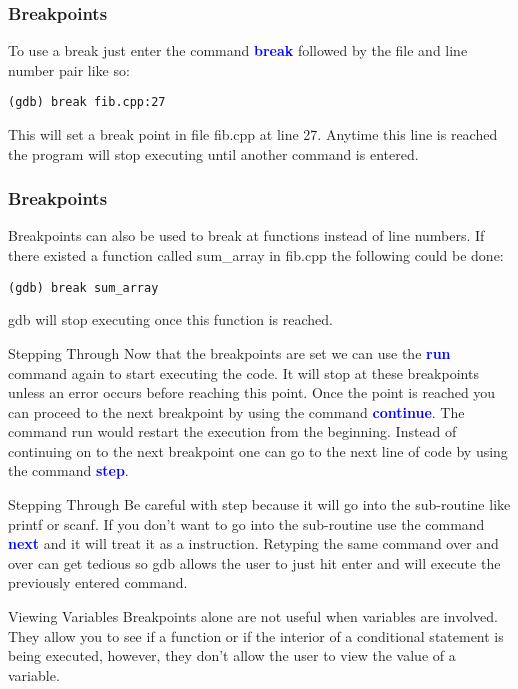 \documentclass[11pt]{beamer}
\begin{document}
\begin{frame}[fragile]
\frametitle{Breakpoints}
To use a break just enter the command \textbf{\textcolor{blue}{break}} followed by the file and line number pair like so:
\begin{lstlisting}[style=BashInputStyle]
(gdb) break fib.cpp:27
\end{lstlisting}
This will set a break point in file fib.cpp at line 27. Anytime this line is reached the program will stop executing until another command is entered. 
\end{frame}

\begin{frame}[fragile]
\frametitle{Breakpoints}
Breakpoints can also be used to break at functions instead of line numbers. If there existed a function called sum\_array in fib.cpp the following could be done:
\begin{lstlisting}[style=BashInputStyle]
(gdb) break sum_array
\end{lstlisting}
gdb will stop executing once this function is reached.
\end{frame}

\begin{frame}{Stepping Through}
Now that the breakpoints are set we can use the \textbf{\textcolor{blue}{run}} command again to start executing the code. It will stop at these breakpoints unless an error occurs before reaching this point.
\break
\break
Once the point is reached you can proceed to the next breakpoint by using the command \textbf{\textcolor{blue}{continue}}. The command run would restart the execution from the beginning.
\break
\break
Instead of continuing on to the next breakpoint one can go to the next line of code by using the command \textbf{\textcolor{blue}{step}}. 
\end{frame}
\begin{frame}{Stepping Through}
Be careful with step because it will go into the sub-routine like printf or scanf. If you don't want to go into the sub-routine use the command \textbf{\textcolor{blue}{next}} and it will treat it as a instruction.
\break
\break
Retyping the same command over and over can get tedious so gdb allows the user to just hit enter and will execute the previously entered command.
\end{frame}

\begin{frame}{Viewing Variables}
Breakpoints alone are not useful when variables are involved. They allow you to see if a function or if the interior of a conditional statement is being executed, however, they don't allow the user to view the value of a variable.
\end{frame}
\end{document}
